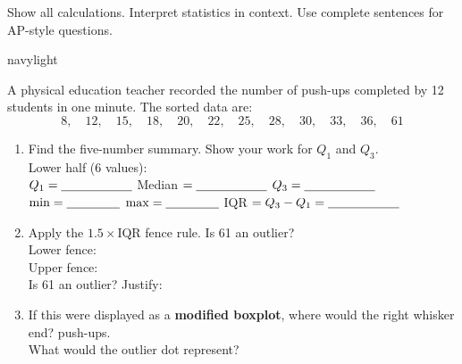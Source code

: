 \documentclass[10pt]{article}
\begin{document}

\vspace{0.10in}

\begin{tcolorbox}[colback=sky, colframe=navy, boxrule=0.8pt, arc=2mm,
    left=3mm, right=3mm, top=1.5mm, bottom=1.5mm]
\small Show all calculations. Interpret statistics in context. Use complete
sentences for AP-style questions.
\end{tcolorbox}

\vspace{0.12in}

\boxguard
\begin{blurbbox}{navylight}
\small

A physical education teacher recorded the number of push-ups completed by
12 students in one minute. The sorted data are:
\[8,\quad 12,\quad 15,\quad 18,\quad 20,\quad 22,\quad 25,\quad 28,\quad 30,\quad 33,\quad 36,\quad 61\]

\vspace{0.10in}

\begin{enumerate}[leftmargin=1.5em, itemsep=8pt]

  \item Find the five-number summary. Show your work for $Q_1$ and $Q_3$.\\[5pt]
        Lower half (6 values): \blank{8cm}\\[4pt]
        $Q_1 = \blank{2cm}$ \quad Median $= \blank{2cm}$ \quad $Q_3 = \blank{2cm}$\\[4pt]
        $\min = \blank{1.5cm}$ \quad $\max = \blank{1.5cm}$ \quad
        IQR $= Q_3 - Q_1 = \blank{2cm}$

  \item Apply the $1.5 \times \text{IQR}$ fence rule. Is 61 an outlier?\\[5pt]
        Lower fence: \blank{6cm}\\[4pt]
        Upper fence: \blank{6cm}\\[4pt]
        Is 61 an outlier? \blank{2cm} \quad Justify: \blank{6cm}

  \item If this were displayed as a \textbf{modified boxplot}, where would the
        right whisker end? \blank{3cm} push-ups. \\[4pt]
        What would the outlier dot represent? \blank{8cm}

\end{enumerate}

\end{blurbbox}
\end{document}
